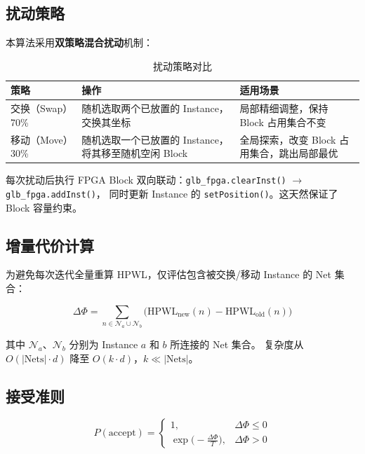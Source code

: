 \documentclass[12pt,a4paper]{ctexart}
\begin{document}
\subsection{扰动策略}

本算法采用\textbf{双策略混合扰动}机制：

\begin{table}[H]
\centering
\caption{扰动策略对比}
\begin{tabular}{@{}p{2.5cm}p{5cm}p{5cm}@{}}
\toprule
\textbf{策略} & \textbf{操作} & \textbf{适用场景} \\
\midrule
交换（Swap）70\% & 随机选取两个已放置的 Instance，交换其坐标 & 局部精细调整，保持 Block 占用集合不变 \\
移动（Move）30\% & 随机选取一个已放置的 Instance，将其移至随机空闲 Block & 全局探索，改变 Block 占用集合，跳出局部最优 \\
\bottomrule
\end{tabular}
\end{table}

每次扰动后执行 FPGA Block 双向联动：\texttt{glb\_fpga.clearInst()} $\rightarrow$ \texttt{glb\_fpga.addInst()}，
同时更新 Instance 的 \texttt{setPosition()}。这天然保证了 Block 容量约束。

\subsection{增量代价计算}

为避免每次迭代全量重算 HPWL，仅评估包含被交换/移动 Instance 的 Net 集合：

\begin{equation}
\Delta\Phi = \sum_{n \in \mathcal{N}_a \cup \mathcal{N}_b} \bigl(\text{HPWL}_{\text{new}}(n) - \text{HPWL}_{\text{old}}(n)\bigr)
\label{eq:delta}
\end{equation}

其中 $\mathcal{N}_a$、$\mathcal{N}_b$ 分别为 Instance $a$ 和 $b$ 所连接的 Net 集合。
复杂度从 $O(|\text{Nets}| \cdot d)$ 降至 $O(k \cdot d)$，$k \ll |\text{Nets}|$。

\subsection{接受准则}

\begin{equation}
P(\text{accept}) = 
\begin{cases}
1, & \Delta\Phi \le 0 \\[4pt]
\exp\bigl(-\frac{\Delta\Phi}{T}\bigr), & \Delta\Phi > 0
\end{cases}
\label{eq:accept}
\end{equation}
\end{document}
